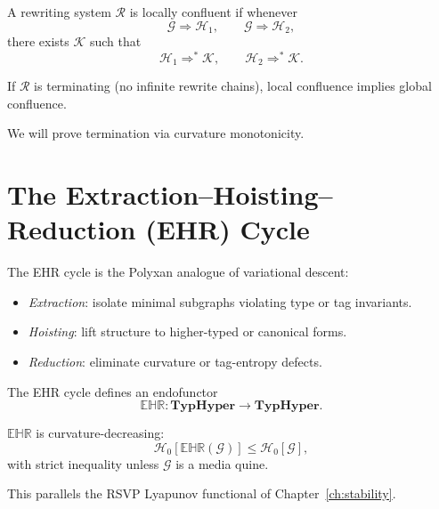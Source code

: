 \begin{definition}
A rewriting system $\mathcal{R}$ is locally confluent if whenever
\[
\mathcal{G} \Rightarrow \mathcal{H}_1,
\qquad
\mathcal{G} \Rightarrow \mathcal{H}_2,
\]
there exists $\mathcal{K}$ such that
\[
\mathcal{H}_1 \Rightarrow^\ast \mathcal{K},
\qquad
\mathcal{H}_2 \Rightarrow^\ast \mathcal{K}.
\]
\end{definition}

\begin{lemma}[Newman]
If $\mathcal{R}$ is terminating (no infinite rewrite chains), local confluence
implies global confluence.
\end{lemma}

We will prove termination via curvature monotonicity.

\section{The Extraction–Hoisting–Reduction (EHR) Cycle}

The EHR cycle is the Polyxan analogue of variational descent:

\begin{itemize}
\item \emph{Extraction}: isolate minimal subgraphs violating type or tag invariants.
\item \emph{Hoisting}: lift structure to higher-typed or canonical forms.
\item \emph{Reduction}: eliminate curvature or tag-entropy defects.
\end{itemize}

\begin{definition}
The EHR cycle defines an endofunctor
\[
\mathbb{EHR} : \mathbf{TypHyper} \to \mathbf{TypHyper}.
\]
\end{definition}

\begin{proposition}
$\mathbb{EHR}$ is curvature-decreasing:
\[
\mathcal{H}_0[\mathbb{EHR}(\mathcal{G})]
\le
\mathcal{H}_0[\mathcal{G}],
\]
with strict inequality unless $\mathcal{G}$ is a media quine.
\end{proposition}

This parallels the RSVP Lyapunov functional of Chapter~\ref{ch:stability}.

